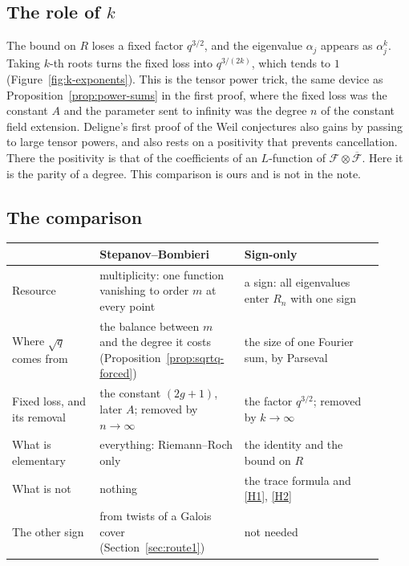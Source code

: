 \documentclass[11pt]{amsbook}
\theoremstyle{plain}
\theoremstyle{definition}
\theoremstyle{remark}
\numberwithin{equation}{section}
\numberwithin{figure}{chapter}
\numberwithin{table}{chapter}
\newcommand{\cF}{\mathcal{F}}
\begin{document}
\subsection{The role of $k$}

The bound on $R$ loses a fixed factor $q^{3/2}$, and the eigenvalue
$\alpha_j$ appears as $\alpha_j^k$. Taking $k$-th roots turns the
fixed loss into $q^{3/(2k)}$, which tends to $1$ (Figure~\ref{fig:k-exponents}). This is the
tensor power trick, the same device as
Proposition~\ref{prop:power-sums} in the first proof, where the
fixed loss was the constant $A$ and the parameter sent to infinity
was the degree $n$ of the constant field extension. Deligne's first
proof of the Weil conjectures \cite{Deligne1974} also gains by
passing to large tensor powers, and also rests on a positivity that
prevents cancellation. There the positivity is that of the
coefficients of an $L$-function of $\cF \otimes \overline{\cF}$.
Here it is the parity of a degree. This comparison is ours and is
not in the note.
\begin{figure}[p]
\centering

\end{figure}

\subsection{The comparison}

\begin{center}
\begin{tabular}{@{}p{0.22\linewidth}p{0.35\linewidth}
p{0.35\linewidth}@{}}
\toprule
 & Stepanov--Bombieri & Sign-only \\
\midrule
Resource & multiplicity: one function vanishing to order $m$ at
every point & a sign: all eigenvalues enter $R_n$ with one sign \\
Where $\sqrt q$ comes from & the balance between $m$ and the degree
it costs (Proposition~\ref{prop:sqrtq-forced}) & the size of one
Fourier sum, by Parseval \\
Fixed loss, and its removal & the constant $(2g+1)$, later $A$;
removed by $n\to\infty$ & the factor $q^{3/2}$; removed by
$k\to\infty$ \\
What is elementary & everything: Riemann--Roch only & the identity
and the bound on $R$ \\
What is not & nothing & the trace formula and
\ref{H1}, \ref{H2} \\
The other sign & from twists of a Galois cover
(Section~\ref{sec:route1}) & not needed \\
\bottomrule
\end{tabular}
\end{center}
\end{document}
